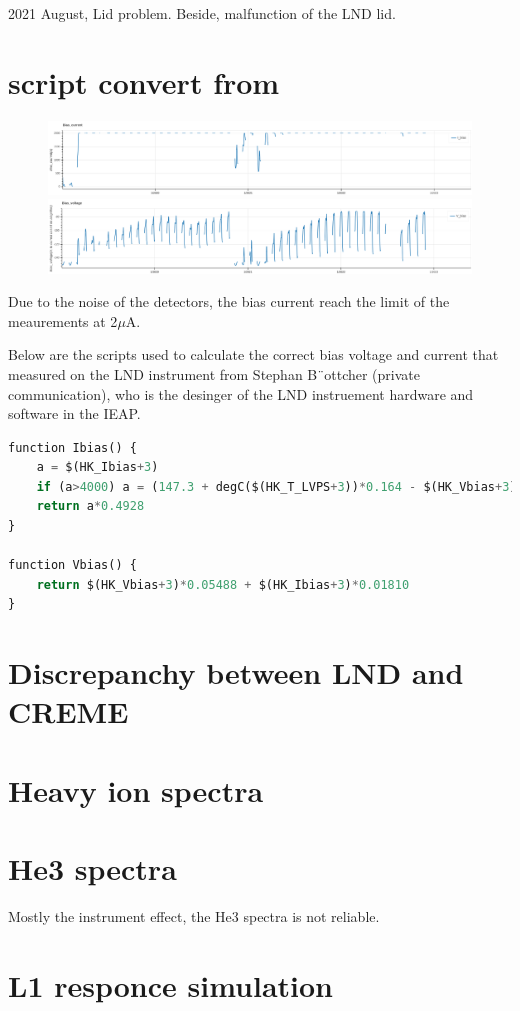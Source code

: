 2021 August, Lid problem. Beside, malfunction of the LND lid.


\section{script convert from }

\begin{figure}
    \centering
    \includegraphics{images/lnd_bias_current.png}
    \includegraphics{images/lnd_bias_voltage.png}
    \caption{}
    \label{}
\end{figure}


    Due to the noise of the detectors, the bias current reach the limit of the meaurements at 2$\mu$A. 

Below are the scripts used to calculate the correct bias voltage and current that measured on the LND instrument from Stephan B¨ottcher (private communication), who is the desinger of the LND instruement hardware and software in the IEAP.
\begin{lstlisting}[language=Python]
function Ibias() {
    a = $(HK_Ibias+3)
    if (a>4000) a = (147.3 + degC($(HK_T_LVPS+3))*0.164 - $(HK_Vbias+3)*0.05488) / 0.01810
    return a*0.4928
}

function Vbias() {
    return $(HK_Vbias+3)*0.05488 + $(HK_Ibias+3)*0.01810
}

\end{lstlisting}
\section{Discrepanchy between LND and CREME}

\section{Heavy ion spectra}

\section{He3 spectra}
Mostly the instrument effect, the He3 spectra is not reliable.

\section{L1 responce simulation}

